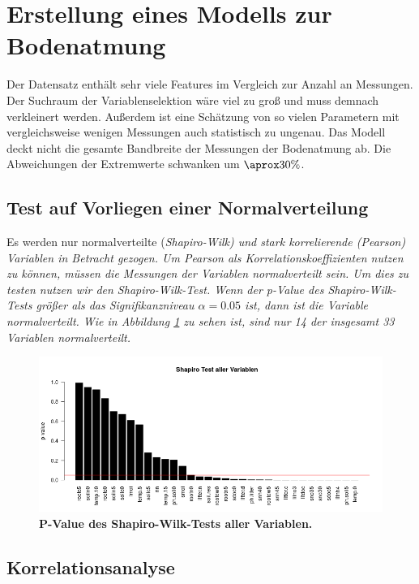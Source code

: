 \section{Erstellung eines Modells zur Bodenatmung}
\label{sec-model}

Der Datensatz enthält sehr viele Features im Vergleich zur Anzahl an Messungen.
Der Suchraum der Variablenselektion wäre viel zu groß und muss demnach verkleinert werden.
Außerdem ist eine Schätzung von so vielen Parametern mit vergleichsweise wenigen Messungen auch statistisch zu ungenau.
Das Modell deckt nicht die gesamte Bandbreite der Messungen der Bodenatmung ab. Die Abweichungen der Extremwerte schwanken  um $\aprox 30\%$.

\subsection{Test auf Vorliegen einer Normalverteilung}

Es werden nur normalverteilte (\it{Shapiro-Wilk}) und stark korrelierende (\it{Pearson}) Variablen in Betracht gezogen.
Um \it{Pearson} als Korrelationskoeffizienten nutzen zu können, müssen die Messungen der Variablen normalverteilt sein.
Um dies zu testen nutzen wir den \it{Shapiro-Wilk-Test}.
Wenn der \it{p-Value} des \it{Shapiro-Wilk-Tests} größer als das Signifikanzniveau $\alpha=0.05$ ist, dann ist die Variable normalverteilt.
Wie in Abbildung \ref{fig:shapiro} zu sehen ist, sind nur 14 der insgesamt 33 Variablen normalverteilt.

\begin{figure}[ht]
	\centering
	\includegraphics[width=\textwidth]{fig/model/normalverteilung-shapiro.png}
	\caption{\bf{P-Value des Shapiro-Wilk-Tests aller Variablen.}}
	\label{fig:shapiro}
\end{figure}

\subsection{Korrelationsanalyse}

